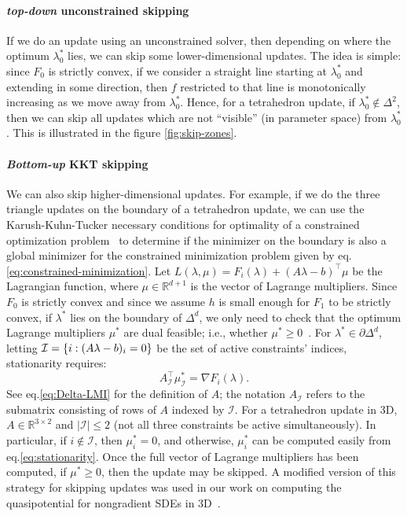 \documentclass[smallcondensed]{svjour3}
\begin{document}
\paragraph{\emph{top-down} unconstrained skipping} If we do an update using
an unconstrained solver, then depending on where the optimum
$\lambda_0^*$ lies, we can skip some lower-dimensional updates. The
idea is simple: since $F_0$ is strictly convex, if we consider a
straight line starting at $\lambda_0^*$ and extending in some
direction, then $f$ restricted to that line is monotonically
increasing as we move away from $\lambda_0^*$. Hence, for a
tetrahedron update, if $\lambda_0^* \notin \Delta^2$, then we can skip
all updates which are not ``visible'' (in parameter space) from
$\lambda_0^*$. This is illustrated in the figure \ref{fig:skip-zones}.

\paragraph{\emph{Bottom-up} KKT skipping} We can also skip higher-dimensional
updates. For example, if we do the three triangle updates on the
boundary of a tetrahedron update, we can use the Karush-Kuhn-Tucker
necessary conditions for optimality of a constrained optimization
problem~\cite{nocedal2006numerical} to determine if the minimizer on
the boundary is also a global minimizer for the constrained
minimization problem given by eq.\@
\ref{eq:constrained-minimization}. Let
$L(\lambda, \mu) = F_i(\lambda) + (A\lambda - b)^\top \mu$ be the
Lagrangian function, where $\mu \in \mathbb{R}^{d + 1}$ is the vector
of Lagrange multipliers. Since $F_0$ is strictly convex and since we
assume $h$ is small enough for $F_1$ to be strictly convex, if
$\lambda^*$ lies on the boundary of $\Delta^d$, we only need to check
that the optimum Lagrange multipliers $\mu^*$ are dual feasible; i.e.,
whether
$\mu^* \geq 0$~\cite{bertsekas1999nonlinear,nocedal2006numerical}. For
$\lambda^* \in \partial \Delta^d$, letting
$\mathcal{I} = \left\{i : (A\lambda - b)_i = 0\right\}$ be the set of active
constraints' indices, stationarity requires:
\begin{equation}\label{eq:stationarity}
  A^\top_{\mathcal{I}} \mu_{\mathcal{I}}^* = \nabla F_i(\lambda).
\end{equation}
See eq.\@ \ref{eq:Delta-LMI} for the definition of $A$; the
notation $A_{\mathcal{I}}$ refers to the submatrix consisting of rows
of $A$ indexed by $\mathcal{I}$. For a tetrahedron update in 3D,
$A \in \mathbb{R}^{3 \times 2}$ and $|\mathcal{I}| \leq 2$ (not all
three constraints be active simultaneously). In particular, if
$i \notin \mathcal{I}$, then $\mu_i^* = 0$, and otherwise, $\mu_i^*$
can be computed easily from eq.\@ \ref{eq:stationarity}. Once the
full vector of Lagrange multipliers has been computed, if
$\mu^* \geq 0$, then the update may be skipped. A modified version of
this strategy for skipping updates was used in our work on computing
the quasipotential for nongradient SDEs in
3D~\cite{yang2019computing}.
\end{document}
